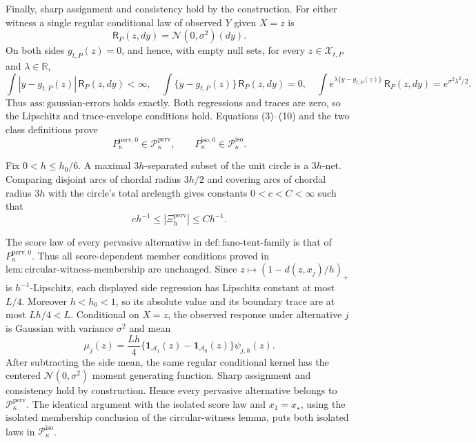 Finally, sharp assignment and consistency hold by the construction.  For
either witness a single regular conditional law of observed \(Y\) given
\(X=z\) is
\[
 \mathsf R_P(z,dy)=\mathcal N(0,\sigma^2)(dy).
\]
On both sides \(g_{t,P}(z)=0\), and hence, with empty null sets, for every
\(z\in\mathcal X_{t,P}\) and \(\lambda\in\mathbb R\),
\[
 \int |y-g_{t,P}(z)|\,\mathsf R_P(z,dy)<\infty,
 \quad
 \int\{y-g_{t,P}(z)\}\,\mathsf R_P(z,dy)=0,
 \quad
 \int e^{\lambda\{y-g_{t,P}(z)\}}\,\mathsf R_P(z,dy)
 =e^{\sigma^2\lambda^2/2}.
 \tag{10}
\]
Thus \(\mathrm{ass:gaussian\text{-}errors}\) holds exactly.  Both
regressions and traces are zero, so the Lipschitz and trace-envelope
conditions hold.  Equations (3)--(10) and the two class definitions prove
\[
 P_{\kappa}^{\mathrm{perv},0}\in\mathcal P_{\kappa}^{\mathrm{perv}},
 \qquad
 P_{\kappa}^{\mathrm{iso},0}\in\mathcal P_{\kappa}^{\mathrm{iso}}.
\]

Fix \(0<h\le h_0/6\).  A maximal \(3h\)-separated subset of the unit
circle is a \(3h\)-net.  Comparing disjoint arcs of chordal radius
\(3h/2\) and covering arcs of chordal radius \(3h\) with the circle's
total arclength gives constants \(0<c<C<\infty\) such that
\[
 c h^{-1}\le |\Xi_h^{\mathrm{perv}}|\le C h^{-1}.
 \tag{11}
\]

The score law of every pervasive alternative in
\(\mathrm{def:fano\text{-}tent\text{-}family}\) is that of
\(P_{\kappa}^{\mathrm{perv},0}\).  Thus all score-dependent member
conditions proved in \(\mathrm{lem:circular\text{-}witness\text{-}membership}\)
are unchanged.  Since \(z\mapsto(1-d(z,x_j)/h)_+\) is
\(h^{-1}\)-Lipschitz, each displayed side regression has Lipschitz
constant at most \(L/4\).  Moreover \(h<h_0<1\), so its absolute value
and its boundary trace are at most \(Lh/4<L\).  Conditional on \(X=z\),
the observed response under alternative \(j\) is Gaussian with variance
\(\sigma^2\) and mean
\[
 \mu_j(z)=\frac{Lh}{4}\{\mathbf1_{\mathcal A_1}(z)
              -\mathbf1_{\mathcal A_0}(z)\}\psi_{j,h}(z).
 \tag{12}
\]
After subtracting the side mean, the same regular conditional kernel has
the centered \(\mathcal N(0,\sigma^2)\) moment generating function.
Sharp assignment and consistency hold by construction.  Hence every
pervasive alternative belongs to
\(\mathcal P_{\kappa}^{\mathrm{perv}}\).  The identical argument with
the isolated score law and \(x_1=x_{\star}\), using the isolated
membership conclusion of the circular-witness lemma, puts both isolated
laws in \(\mathcal P_{\kappa}^{\mathrm{iso}}\).

